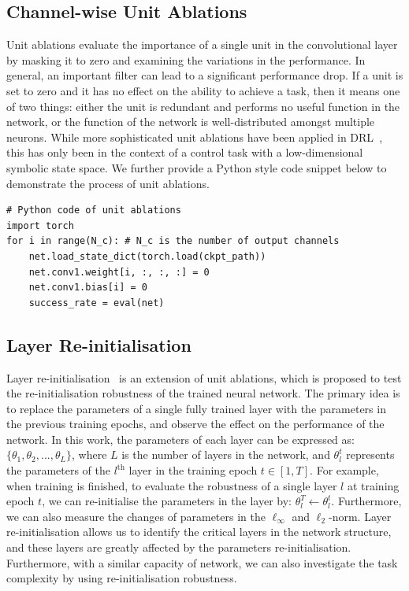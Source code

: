 \subsection{Channel-wise Unit Ablations}
Unit ablations evaluate the importance of a single unit in the convolutional layer by masking it to zero and examining the variations in the performance. In general, an important filter can lead to a significant performance drop. If a unit is set to zero and it has no effect on the ability to achieve a task, then it means one of two things: either the unit is redundant and performs no useful function in the network, or the function of the network is well-distributed amongst multiple neurons. While more sophisticated unit ablations have been applied in DRL~\cite{meyes2020you}, {this has only been in the context of a control task with a low-dimensional symbolic state space}. We further provide a Python style code snippet below to demonstrate the process of unit ablations.
\begin{verbatim}
# Python code of unit ablations
import torch
for i in range(N_c): # N_c is the number of output channels
    net.load_state_dict(torch.load(ckpt_path))
    net.conv1.weight[i, :, :, :] = 0
    net.conv1.bias[i] = 0
    success_rate = eval(net)
\end{verbatim}
\subsection{Layer Re-initialisation}
Layer re-initialisation~\cite{zhang2019all} is an extension of unit ablations, which is proposed to test the re-initialisation robustness of the trained neural network. The primary idea is to replace the parameters of a single fully trained layer with the parameters in the previous training epochs, and observe the effect on the performance of the network. In this work, the parameters of each layer can be expressed as: $\{\theta_{1}, \theta_{2}, ..., \theta_{L}\}$, where $L$ is the number of layers in the network, and $\theta_{l}^{t}$ represents the parameters of the $l^\text{th}$ layer in the training epoch $t\in [1,T]$. For example, when training is finished, to evaluate the robustness of a single layer $l$ at training epoch $t$, we can re-initialise the parameters in the layer by: $\theta_{l}^{T} \leftarrow \theta_{l}^{t}$. Furthermore, we can also measure the changes of parameters in the $\ell_{\infty}$ and $\ell_{2}$-norm. Layer re-initialisation allows us to identify the critical layers in the network structure, and these layers are greatly affected by the parameters re-initialisation. Furthermore, with a similar capacity of network, we can also investigate the task complexity by using re-initialisation robustness.

